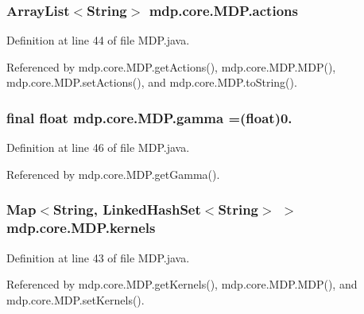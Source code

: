 \subsubsection[{actions}]{\setlength{\rightskip}{0pt plus 5cm}Array\+List$<$String$>$ mdp.\+core.\+M\+D\+P.\+actions\hspace{0.3cm}{\ttfamily [private]}}\label{classmdp_1_1core_1_1_m_d_p_a9da06680f73a486a6ee65c8208151e70}


Definition at line 44 of file M\+D\+P.\+java.



Referenced by mdp.\+core.\+M\+D\+P.\+get\+Actions(), mdp.\+core.\+M\+D\+P.\+M\+D\+P(), mdp.\+core.\+M\+D\+P.\+set\+Actions(), and mdp.\+core.\+M\+D\+P.\+to\+String().

\hypertarget{classmdp_1_1core_1_1_m_d_p_ab240c1d97d39d6f66cff0c8d06a57a69}{}
\subsubsection[{gamma}]{\setlength{\rightskip}{0pt plus 5cm}final float mdp.\+core.\+M\+D\+P.\+gamma =(float)0.\hspace{0.3cm}{\ttfamily [private]}}\label{classmdp_1_1core_1_1_m_d_p_ab240c1d97d39d6f66cff0c8d06a57a69}


Definition at line 46 of file M\+D\+P.\+java.



Referenced by mdp.\+core.\+M\+D\+P.\+get\+Gamma().

\hypertarget{classmdp_1_1core_1_1_m_d_p_ac185a95b0c9eb78b9d5a00b214696191}{}
\subsubsection[{kernels}]{\setlength{\rightskip}{0pt plus 5cm}Map$<$String, Linked\+Hash\+Set$<$String$>$ $>$ mdp.\+core.\+M\+D\+P.\+kernels\hspace{0.3cm}{\ttfamily [private]}}\label{classmdp_1_1core_1_1_m_d_p_ac185a95b0c9eb78b9d5a00b214696191}


Definition at line 43 of file M\+D\+P.\+java.



Referenced by mdp.\+core.\+M\+D\+P.\+get\+Kernels(), mdp.\+core.\+M\+D\+P.\+M\+D\+P(), and mdp.\+core.\+M\+D\+P.\+set\+Kernels().

